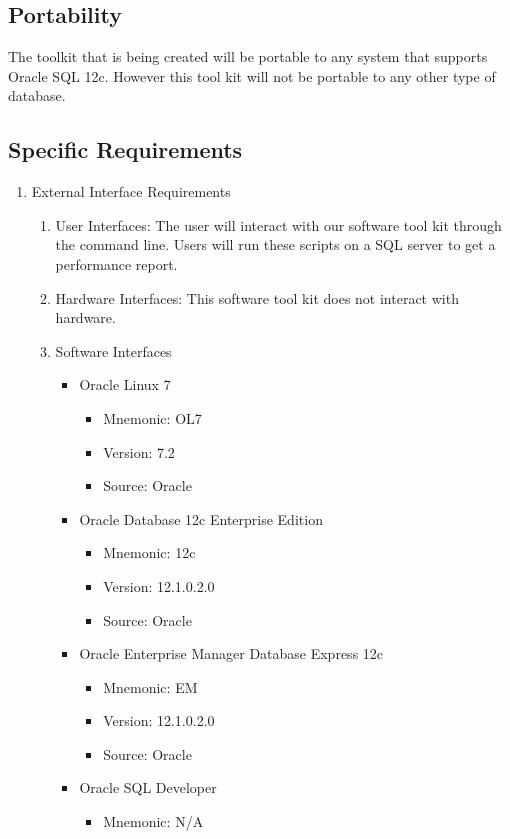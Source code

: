 \documentclass[draftclsnofoot, onecolumn, compsoc, 10pt]{IEEEtran}
\begin{document}
\subsection{Portability}
The toolkit that is being created will be portable to any system that supports Oracle SQL 12c. However this tool kit will not be portable to any other type of database.  

\subsection{Specific Requirements}
\begin{enumerate}
	\item External Interface Requirements
	\begin{enumerate}
    	\item User Interfaces: The user will interact with our software tool kit through the command line.
Users will run these scripts on a SQL server to get a performance report.
        \item Hardware Interfaces: This software tool kit does not interact with hardware.
        \item Software Interfaces
        \begin{itemize}
	\item Oracle Linux 7
	\begin{itemize}
		\item Mnemonic: OL7
		\item Version: 7.2
        \item Source: Oracle
	\end{itemize}
	\item Oracle Database 12c Enterprise Edition
	\begin{itemize}
		\item Mnemonic: 12c
        \item Version: 12.1.0.2.0
        \item Source: Oracle
	\end{itemize}
    \item Oracle Enterprise Manager Database Express 12c
	\begin{itemize}
		\item Mnemonic: EM
        \item Version: 12.1.0.2.0
        \item Source: Oracle
	\end{itemize}
   	\item Oracle SQL Developer
	\begin{itemize}
		\item Mnemonic: N/A

\end{itemize}
\end{itemize}
\end{enumerate}
\end{enumerate}
\end{document}

